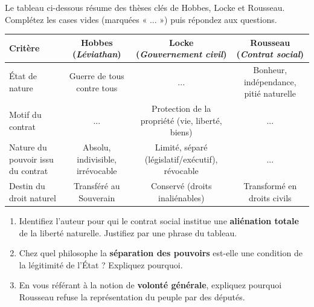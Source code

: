 \documentclass[11pt]{article}
\begin{document}
\begin{exercice}
Le tableau ci-dessous résume des thèses clés de Hobbes, Locke et Rousseau. Complétez les cases vides (marquées « ... ») puis répondez aux questions.

\begin{tabularx}{\linewidth}{|X|c|c|c|}
\hline
\textbf{Critère} & \textbf{Hobbes (\textit{Léviathan})} & \textbf{Locke (\textit{Gouvernement civil})} & \textbf{Rousseau (\textit{Contrat social})} \\
\hline
État de nature & Guerre de tous contre tous & ... & Bonheur, indépendance, pitié naturelle \\
\hline
Motif du contrat & ... & Protection de la propriété (vie, liberté, biens) & ... \\
\hline
Nature du pouvoir issu du contrat & Absolu, indivisible, irrévocable & Limité, séparé (législatif/exécutif), révocable & ... \\
\hline
Destin du droit naturel & Transféré au Souverain & Conservé (droits inaliénables) & Transformé en droits civils \\
\hline
\end{tabularx}

\begin{enumerate}
    \item Identifiez l'auteur pour qui le contrat social institue une \textbf{aliénation totale} de la liberté naturelle. Justifiez par une phrase du tableau.
    \item Chez quel philosophe la \textbf{séparation des pouvoirs} est-elle une condition de la légitimité de l'État ? Expliquez pourquoi.
    \item En vous référant à la notion de \textbf{volonté générale}, expliquez pourquoi Rousseau refuse la représentation du peuple par des députés.
\end{enumerate}
\end{exercice}
\end{document}
